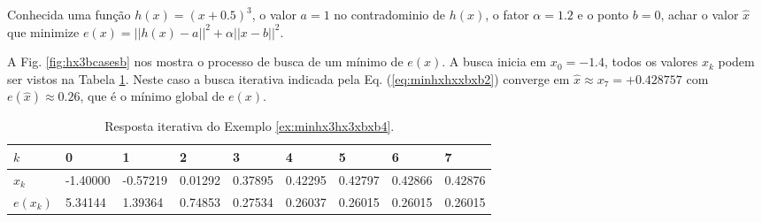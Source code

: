 \begin{example}\label{ex:minhx3hx3xbxb4}
Conhecida uma função $h(x)=(x+0.5)^3$, o valor $a=1$ no contradominio de $h(x)$,
o fator $\alpha=1.2$ e o ponto $b=0$,
achar o valor $\hat{x}$ que minimize $e(x)=||h(x)-a||^2+\alpha||x-b||^2$.
\end{example}
\begin{SolutionT}\label{sol:minhx3hx3xbxb4}
 A Fig. \ref{fig:hx3bcasesb} nos mostra o processo de busca de um mínimo
 de $e(x)$. A busca inicia em $x_0=-1.4$,
 todos os valores $x_{k}$ podem ser vistos na Tabela \ref{tab:hx3bcases4}. 
Neste caso a busca iterativa indicada pela Eq. (\ref{eq:minhxhxxbxb2}) converge 
em $\hat{x}\approx x_7=+0.428757$ com $e(\hat{x})\approx 0.26$,
que é o mínimo global de $e(x)$.

\end{SolutionT}


\begin{table}[!h]
\centering
\begin{tabular}{|l|l|l|l|l|l|l|l|l|}
\hline
$k$      & 0 & 1 & 2 & 3 & 4 & 5 & 6 & 7 \\ \hline
$x_k$    & -1.40000 & -0.57219  & 0.01292  & 0.37895  & 0.42295  & 0.42797  & 0.42866  & 0.42876 \\ \hline
$e(x_k)$ &  5.34144 &  1.39364  & 0.74853  & 0.27534  & 0.26037  & 0.26015  & 0.26015  & 0.26015 \\ \hline
\end{tabular}
\caption{Resposta iterativa do Exemplo \ref{ex:minhx3hx3xbxb4}.}
\label{tab:hx3bcases4}
\end{table}


